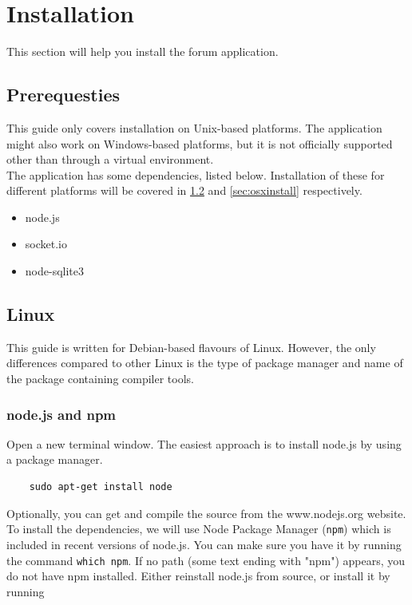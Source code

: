 \documentclass[a4paper, 12pt, titlepage]{article}
\begin{document}
	\section{Installation}
	This section will help you install the forum application.

	\subsection{Prerequesties}
	This guide only covers installation on Unix-based platforms. The application might also work on Windows-based platforms, but it is not officially supported other than through a virtual environment.\\

	The application has some dependencies, listed below. Installation of these for different platforms will be covered in \ref{sec:linuxinstall} and \ref{sec:osxinstall} respectively.

	\begin{itemize}
		\item node.js
		\item socket.io
		\item node-sqlite3
	\end{itemize}

	\subsection{Linux}
	\label{sec:linuxinstall}
	This guide is written for Debian-based flavours of Linux. However, the only differences compared to other Linux is the type of package manager and name of the package containing compiler tools.

	\subsubsection{node.js and npm}
	Open a new terminal window. The easiest approach is to install node.js by using a package manager.

	\begin{lstlisting}
	sudo apt-get install node
	\end{lstlisting}

	Optionally, you can get and compile the source from the www.nodejs.org website.\\

	To install the dependencies, we will use Node Package Manager (\lstinline{npm}) which is included in recent versions of node.js. You can make sure you have it by running the command \lstinline{which npm}. If no path (some text ending with "npm") appears, you do not have npm installed. Either reinstall node.js from source, or install it by running
\end{document}
